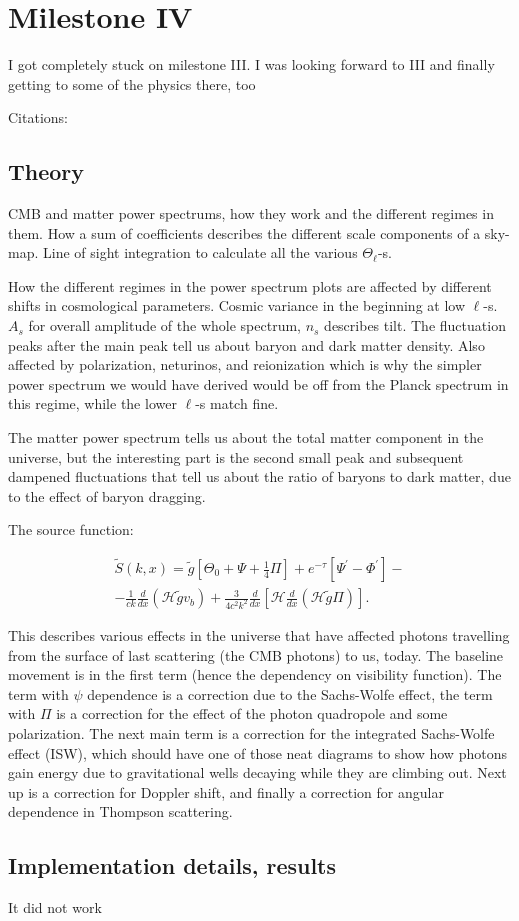 \section{Milestone IV}
I got completely stuck on milestone III. I was looking forward to III and finally getting to some of the physics there, too

Citations: \citet{fixsenCosmicMicrowaveBackground1996}

\subsection{Theory}
CMB and matter power spectrums, how they work and the different regimes in them. How a sum of coefficients describes the different scale components of a sky-map. Line of sight integration to calculate all the various $\Theta_\ell$-s.

How the different regimes in the power spectrum plots are affected by different shifts in cosmological parameters. Cosmic variance in the beginning at low $\ell$-s. $A_s$ for overall amplitude of the whole spectrum, $n_s$ describes tilt. The fluctuation peaks after the main peak tell us about baryon and dark matter density. Also affected by polarization, neturinos, and reionization which is why the simpler power spectrum we would have derived would be off from the Planck spectrum in this regime, while the lower $\ell$-s match fine.

The matter power spectrum tells us about the total matter component in the universe, but the interesting part is the second small peak and subsequent dampened fluctuations that tell us about the ratio of baryons to dark matter, due to the effect of baryon dragging.

The source function:

\begin{equation}\label{eq:source_function}
\begin{aligned}
    \tilde{S}(k,x) = \tilde{g}\left[ \Theta_0 + \Psi + \frac{1}{4}\Pi\right] + e^{-\tau} \left[\Psi^\prime-\Phi^\prime\right] - \\
    - \frac{1}{ck}\frac{d}{dx}(\mathcal{H}\tilde{g}v_b) + \frac{3}{4c^2k^2} \frac{d}{dx} \left[\mathcal{H}\frac{d}{dx} (\mathcal{H}\tilde{g}\Pi)\right].
\end{aligned}
\end{equation}

This describes various effects in the universe that have affected photons travelling from the surface of last scattering (the CMB photons) to us, today. The baseline movement is in the first term (hence the dependency on visibility function). The term with $\psi$ dependence is a correction due to the Sachs-Wolfe effect, the term with $\Pi$ is a correction for the effect of the photon quadropole and some polarization. The next main term is a correction for the integrated Sachs-Wolfe effect (ISW), which should have one of those neat diagrams to show how photons gain energy due to gravitational wells decaying while they are climbing out. Next up is a correction for Doppler shift, and finally a correction for angular dependence in Thompson scattering.

\subsection{Implementation details, results}
It did not work
